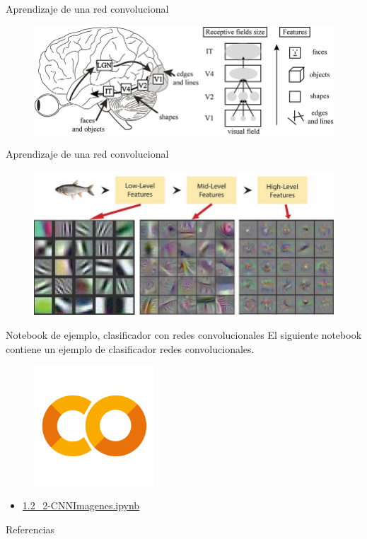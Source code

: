 \begin{frame}{Aprendizaje de una red convolucional}
\begin{figure}
    \centering
    \includegraphics[width=\textwidth]{Slides/figures/Tema 3/Cortex.jpg}
    \caption{\cite{Cortex}}
\end{figure}
\end{frame}

\begin{frame}{Aprendizaje de una red convolucional}
\begin{figure}
    \centering
    \includegraphics[width=\textwidth]{Slides/figures/Tema 3/ConvHierarchy.png}
    \caption{\cite{siddiqui2018automatic}}
\end{figure}
\end{frame}

\begin{frame}{Notebook de ejemplo, clasificador con redes convolucionales}
El siguiente notebook contiene un ejemplo de clasificador redes convolucionales.

\begin{figure}
    \centering
    \includegraphics[width=0.4\textwidth]{Slides/figures/GoogleColab.png}
\end{figure}
\begin{itemize}
    \centering
    \item {\Large \href{https://colab.research.google.com/drive/19TfnBBgbAEDG4YC7EGwcJ6ETZi-xfAiL?usp=sharing}{1.2\_2-CNNImagenes.ipynb}}
\end{itemize}
\end{frame}


\begin{frame}[allowframebreaks]{Referencias}
    
    
\end{frame}

